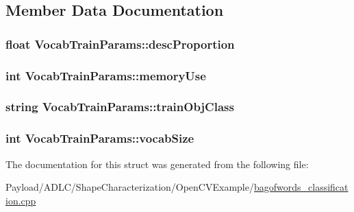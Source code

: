 \subsection{Member Data Documentation}
\hypertarget{structVocabTrainParams_a826922a4a2c21733527b3dc09d06d6d0}{
\subsubsection[{desc\-Proportion}]{\setlength{\rightskip}{0pt plus 5cm}float Vocab\-Train\-Params\-::desc\-Proportion}}\label{structVocabTrainParams_a826922a4a2c21733527b3dc09d06d6d0}
\hypertarget{structVocabTrainParams_a496bcb5542cfbea6363fc058de4e200e}{
\subsubsection[{memory\-Use}]{\setlength{\rightskip}{0pt plus 5cm}int Vocab\-Train\-Params\-::memory\-Use}}\label{structVocabTrainParams_a496bcb5542cfbea6363fc058de4e200e}
\hypertarget{structVocabTrainParams_a091823486f23d578abfbc45c16ee01db}{
\subsubsection[{train\-Obj\-Class}]{\setlength{\rightskip}{0pt plus 5cm}string Vocab\-Train\-Params\-::train\-Obj\-Class}}\label{structVocabTrainParams_a091823486f23d578abfbc45c16ee01db}
\hypertarget{structVocabTrainParams_af674926f696f54c5016aaca00c5df491}{
\subsubsection[{vocab\-Size}]{\setlength{\rightskip}{0pt plus 5cm}int Vocab\-Train\-Params\-::vocab\-Size}}\label{structVocabTrainParams_af674926f696f54c5016aaca00c5df491}


The documentation for this struct was generated from the following file\-:\begin{DoxyCompactItemize}
\item 
Payload/\-A\-D\-L\-C/\-Shape\-Characterization/\-Open\-C\-V\-Example/\hyperlink{bagofwords__classification_8cpp}{bagofwords\-\_\-classification.\-cpp}\end{DoxyCompactItemize}
